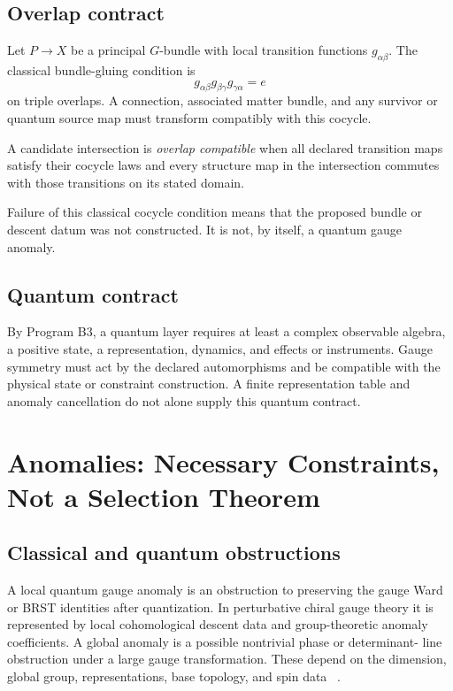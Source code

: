 \documentclass[11pt]{article}
\begin{document}
\subsection{Overlap contract}

Let $P\to X$ be a principal $G$-bundle with local transition functions
$g_{\alpha\beta}$.  The classical bundle-gluing condition is
\[
 g_{\alpha\beta}g_{\beta\gamma}g_{\gamma\alpha}=e
\]
on triple overlaps.  A connection, associated matter bundle, and any survivor
or quantum source map must transform compatibly with this cocycle.

\begin{definition}
A candidate intersection is \emph{overlap compatible} when all declared
transition maps satisfy their cocycle laws and every structure map in the
intersection commutes with those transitions on its stated domain.
\end{definition}

Failure of this classical cocycle condition means that the proposed bundle or
descent datum was not constructed.  It is not, by itself, a quantum gauge
anomaly.

\subsection{Quantum contract}

By Program B3, a quantum layer requires at least a complex observable algebra,
a positive state, a representation, dynamics, and effects or instruments.
Gauge symmetry must act by the declared automorphisms and be compatible with
the physical state or constraint construction.  A finite representation table
and anomaly cancellation do not alone supply this quantum contract.

\section{Anomalies: Necessary Constraints, Not a Selection Theorem}

\subsection{Classical and quantum obstructions}

A local quantum gauge anomaly is an obstruction to preserving the gauge Ward
or BRST identities after quantization.  In perturbative chiral gauge theory it
is represented by local cohomological descent data and group-theoretic anomaly
coefficients.  A global anomaly is a possible nontrivial phase or determinant-
line obstruction under a large gauge transformation.  These depend on the
dimension, global group, representations, base topology, and spin data
~\cite{Bertlmann,Bilal,WittenSU2}.
\end{document}
